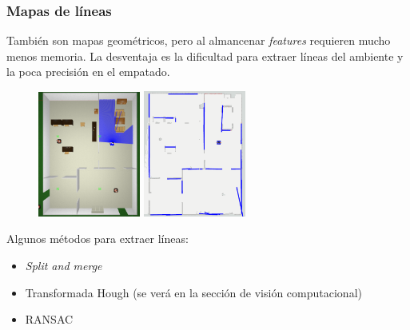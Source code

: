 \begin{frame}\frametitle{Mapas de líneas}
  También son mapas geométricos, pero al almancenar \textit{features} requieren mucho menos memoria. La desventaja es la dificultad para extraer líneas del ambiente y la poca precisión en el empatado. 
  \begin{figure}
    \centering
    \includegraphics[width=0.3\textwidth]{Figures/MapLinesGazebo.png}
    \includegraphics[width=0.3\textwidth]{Figures/MapLines.png}
  \end{figure}
  Algunos métodos para extraer líneas:
  \begin{itemize}
  \item \textit{Split and merge}
  \item Transformada Hough (se verá en la sección de visión computacional)
  \item RANSAC
  \end{itemize}
\end{frame}

